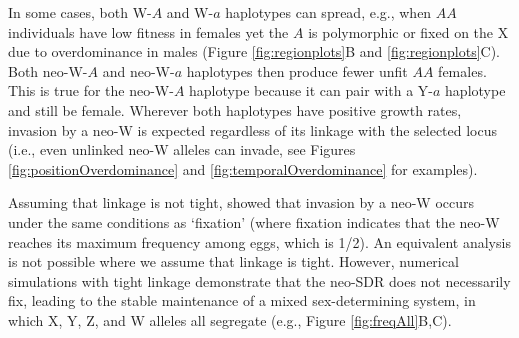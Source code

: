 \documentclass[12pt]{article}
\begin{document}
In some cases, both W-$A$ and W-$a$ haplotypes can spread, e.g., when $AA$ individuals have low fitness in females yet the $A$ is polymorphic or fixed on the X due to overdominance in males (Figure \ref{fig:regionplots}B and \ref{fig:regionplots}C).
Both neo-W-$A$ and neo-W-$a$ haplotypes then produce fewer unfit $AA$ females.
This is true for the neo-W-$A$ haplotype because it can pair with a Y-$a$ haplotype and still be female. 
Wherever both haplotypes have positive growth rates, invasion by a neo-W is expected regardless of its linkage with the selected locus (i.e., even unlinked neo-W alleles can invade, see Figures \ref{fig:positionOverdominance} and \ref{fig:temporalOverdominance} for examples). 

Assuming that linkage is not tight, \citet{vanDoorn:2010hu} showed that invasion by a neo-W occurs under the same conditions as `fixation' (where fixation indicates that the neo-W reaches its maximum frequency among eggs, which is 1/2). 
An equivalent analysis is not possible where we assume that linkage is tight. 
However, numerical simulations with tight linkage demonstrate that the neo-SDR does not necessarily fix, leading to the stable maintenance of a mixed sex-determining system, in which X, Y, Z, and W alleles all segregate (e.g., Figure \ref{fig:freqAll}B,C). 

 
\end{document}
